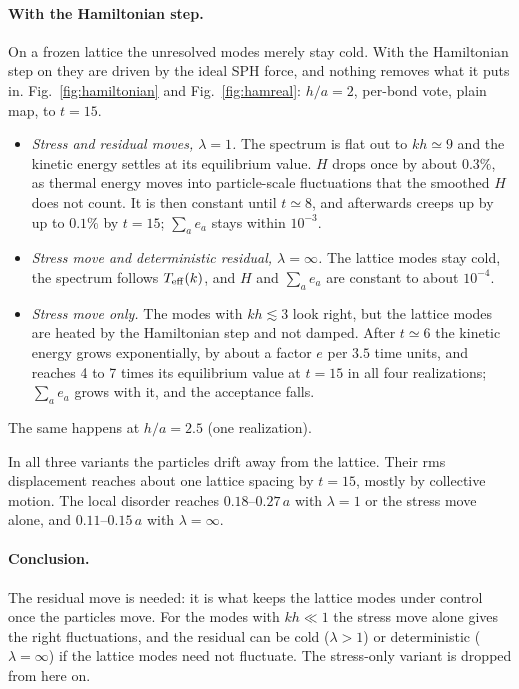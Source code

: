 \documentclass[11pt,aps,preprint,nofootinbib,superscriptaddress,tightenlines]{revtex4-2}
\def\Fig#1{Fig.~\ref{#1}}
\let\oldparagraph\paragraph
\renewcommand{\paragraph}{\par\bigskip\oldparagraph}
\begin{document}
\paragraph{With the Hamiltonian step.}  On a frozen lattice the unresolved modes
merely stay cold.  With the Hamiltonian step on they are driven by the ideal SPH
force, and nothing removes what it puts in.  \Fig{fig:hamiltonian} and
\Fig{fig:hamreal}: $h/a=2$, per-bond vote, plain map, to $t=15$.
\begin{itemize}
\item \emph{Stress and residual moves, $\lambda=1$.}  The spectrum is flat out to
  $kh\simeq9$ and the kinetic energy settles at its equilibrium value.  $H$ drops
  once by about $0.3\%$, as thermal energy moves into particle-scale fluctuations
  that the smoothed $H$ does not count.  It is then constant until $t\simeq8$, and
  afterwards creeps up by up to $0.1\%$ by $t=15$; $\sum_ae_a$ stays within
  $10^{-3}$.
\item \emph{Stress move and deterministic residual, $\lambda=\infty$.}  The lattice
  modes stay cold, the spectrum follows $T_{\rm eff}(k)$, and $H$ and $\sum_ae_a$
  are constant to about $10^{-4}$.
\item \emph{Stress move only.}  The modes with $kh\lesssim3$ look right, but the
  lattice modes are heated by the Hamiltonian step and not damped.  After
  $t\simeq6$ the kinetic energy grows exponentially, by about a factor $e$ per
  $3.5$ time units, and reaches 4 to 7 times its equilibrium value at $t=15$ in
  all four realizations; $\sum_ae_a$ grows with it, and the acceptance falls.
\end{itemize}
The same happens at $h/a=2.5$ (one realization).

In all three variants the particles drift away from the lattice.  Their rms
displacement reaches about one lattice spacing by $t=15$, mostly by collective
motion.  The local disorder reaches $0.18$--$0.27\,a$ with $\lambda=1$ or the stress
move alone, and $0.11$--$0.15\,a$ with $\lambda=\infty$.

\paragraph{Conclusion.}  The residual move is needed: it is what keeps the
lattice modes under control once the particles move.  For the modes with
$kh\ll1$ the stress move alone gives the right fluctuations, and the residual
can be cold ($\lambda>1$) or deterministic ($\lambda=\infty$) if the lattice modes need
not fluctuate.  The stress-only variant is dropped from here on.
\end{document}
